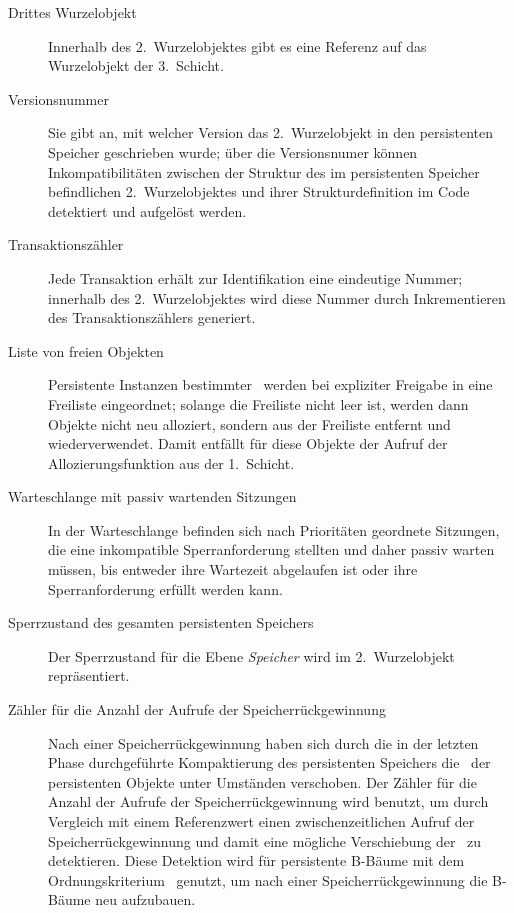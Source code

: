 \begin{description}
%
\item[Drittes Wurzelobjekt]
Innerhalb des 2.~Wurzelobjektes gibt es eine Referenz auf das
Wurzelobjekt der 3.~Schicht.
%
\item[Versionsnummer]
Sie gibt an, mit welcher Version das 2.~Wurzelobjekt in den
persistenten Speicher geschrieben wurde; \"{u}ber die Versionsnumer
k\"{o}n\-nen Inkompatibilit\"{a}ten zwischen der Struktur des im persistenten
Speicher befindlichen 2.~Wurzelobjektes und ihrer Strukturdefinition
im Code detektiert und aufgel\"{o}st werden.
%
\item[Transaktionsz\"{a}hler]
Jede Transaktion erh\"{a}lt zur Identifikation eine eindeutige Nummer;
innerhalb des 2.~Wurzelobjektes wird diese Nummer durch Inkrementieren
des Trans\-ak\-tions\-z\"{a}h\-lers generiert.
%
\item[Liste von freien Objekten]
Persistente Instanzen bestimmter \cls[n]\ werden bei expliziter
Freigabe in eine Freiliste eingeordnet; solange die Freiliste nicht
leer ist, werden dann Objekte nicht neu alloziert, sondern aus der
Freiliste entfernt und wiederverwendet. Damit entf\"{a}llt f\"{u}r diese
Objekte der Aufruf der Allozierungsfunktion aus der 1.~Schicht.
%
\item[Warteschlange mit passiv wartenden Sitzungen]
In der Warteschlange befinden sich nach Prio\-ri\-t\"{a}\-ten geordnete
Sitzungen, die eine inkompatible Sperranforderung stellten und
daher passiv warten m\"{u}ssen, bis entweder ihre Wartezeit abgelaufen
ist oder ihre Sperranforderung erf\"{u}llt werden kann.
%
\item[Sperrzustand des gesamten persistenten Speichers]
Der Sperrzustand f\"{u}r die Ebene {\em Speicher\/} wird im
2.~Wurzelobjekt repr\"{a}sentiert.
%
\item[Z\"{a}hler f\"{u}r die Anzahl der Aufrufe der Speicherr\"{u}ckgewinnung]
Nach einer Spei\-cher\-r\"{u}ck\-ge\-win\-nung haben sich durch die in
der letzten Phase durchgef\"{u}hrte Kompaktierung des persistenten
Speichers die \lobjid[s]\ der persistenten Objekte unter Umst\"{a}nden
verschoben. Der Z\"{a}h\-ler f\"{u}r die Anzahl der Aufrufe der
Spei\-cher\-r\"{u}ck\-ge\-win\-nung wird benutzt, um durch Vergleich mit
einem Referenzwert einen zwischenzeitlichen Aufruf der
Spei\-cher\-r\"{u}ck\-ge\-win\-nung und damit eine m\"{o}gliche Verschiebung
der \lobjid[s]\ zu detektieren. Diese Detektion wird f\"{u}r persistente
B-B\"{a}ume mit dem Ordnungskriterium \ genutzt, um nach einer
Spei\-cher\-r\"{u}ck\-ge\-win\-nung die B-B\"{a}ume neu aufzubauen.
%
\end{description}
